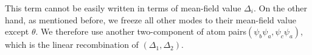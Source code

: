 This term cannot be easily written in terms of mean-field value $\Delta_i$.   On the other hand, as mentioned before, we freeze all  other modes to their mean-field value except $\theta$.  We therefore use another two-component of atom pairs$({\psi_{b}\psi_{a}},{\psi_{c}\psi_{a}})$, which is the linear recombination of $(\Delta_{1},\Delta_{2})$.  

